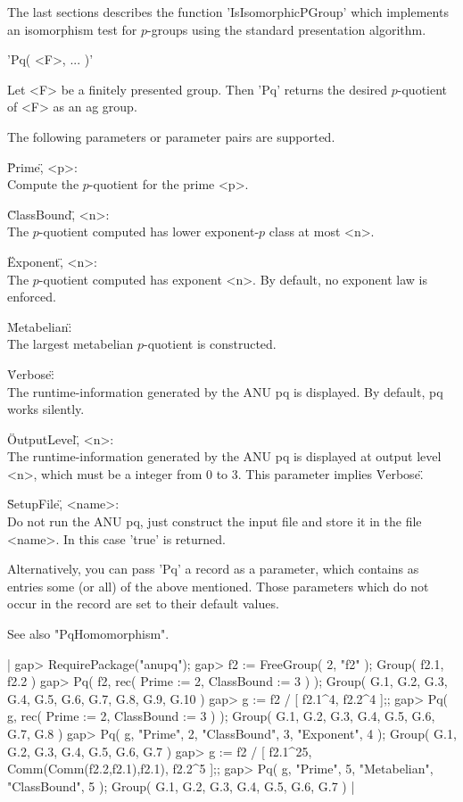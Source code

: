 The  last sections  describes  the  function  'IsIsomorphicPGroup'  which
implements  an  isomorphism  test  for  $p$-groups  using  the   standard
presentation algorithm.


'Pq( <F>, ... )'

Let <F> be a  finitely presented  group.  Then  'Pq' returns  the desired
$p$-quotient of <F> as an ag group.

The following parameters or parameter pairs are supported.

\"Prime\", <p>: \\
    Compute the $p$-quotient for the prime <p>.

\"ClassBound\", <n>: \\
    The $p$-quotient computed has lower exponent-$p$ class at most <n>.

\"Exponent\", <n>: \\
    The $p$-quotient computed has exponent <n>.
    By default, no exponent law is enforced.

\"Metabelian\": \\
    The largest metabelian $p$-quotient is constructed.

\"Verbose\": \\
    The runtime-information generated  by  the ANU  pq is  displayed.  By
    default, pq works silently.

\"OutputLevel\", <n>: \\
    The runtime-information  generated by the  ANU  pq  is  displayed  at
    output  level  <n>,  which  must  be a  integer from  0 to  3.   This
    parameter implies \"Verbose\".

\"SetupFile\", <name>: \\
    Do not run the ANU pq, just  construct the input file and store it in
    the file <name>. In this case 'true' is returned.

Alternatively, you can pass 'Pq' a record as a parameter, which  contains
as entries some (or all)  of the above mentioned.  Those parameters which
do not occur in the record are set to their default values.

See also "PqHomomorphism".

|    gap> RequirePackage("anupq");
    gap> f2 := FreeGroup( 2, "f2" );
    Group( f2.1, f2.2 )
    gap> Pq( f2, rec( Prime := 2,  ClassBound := 3 ) );
    Group( G.1, G.2, G.3, G.4, G.5, G.6, G.7, G.8, G.9, G.10 )
    gap> g := f2 / [ f2.1^4, f2.2^4 ];;
    gap> Pq( g, rec( Prime := 2, ClassBound := 3 ) );
    Group( G.1, G.2, G.3, G.4, G.5, G.6, G.7, G.8 )
    gap> Pq( g, "Prime", 2, "ClassBound", 3, "Exponent", 4 );
    Group( G.1, G.2, G.3, G.4, G.5, G.6, G.7 )
    gap> g := f2 / [ f2.1^25, Comm(Comm(f2.2,f2.1),f2.1), f2.2^5 ];;
    gap> Pq( g, "Prime", 5, "Metabelian", "ClassBound", 5 );
    Group( G.1, G.2, G.3, G.4, G.5, G.6, G.7 ) |

